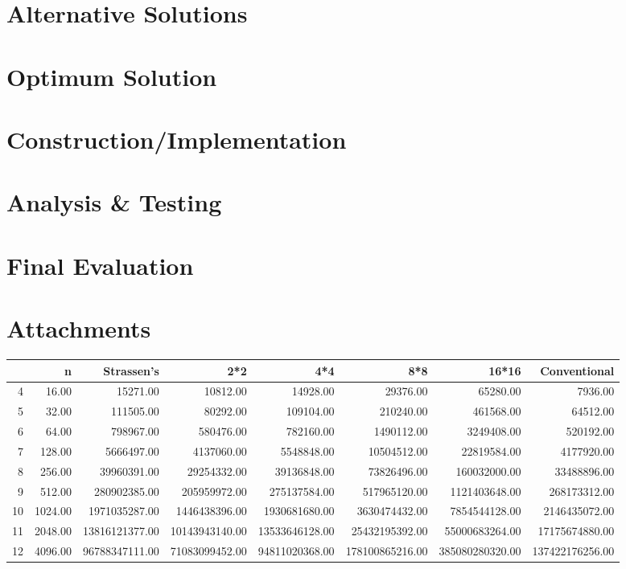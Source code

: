 \documentclass[a4paper, 11pt]{article}
\begin{document}
\section*{Alternative Solutions}

\section*{Optimum Solution}

\section*{Construction/Implementation}

\section*{Analysis \& Testing}

\section*{Final Evaluation}

\section*{Attachments}
\begin{landscape}
	\centering
	\begin{tabular}{rrrrrrrr}
		\hline
		& n & Strassen's & 2*2 & 4*4 & 8*8 & 16*16 & Conventional \\ 
		\hline
		4 & 16.00 & 15271.00 & 10812.00 & 14928.00 & 29376.00 & 65280.00 & 7936.00 \\ 
		5 & 32.00 & 111505.00 & 80292.00 & 109104.00 & 210240.00 & 461568.00 & 64512.00 \\ 
		6 & 64.00 & 798967.00 & 580476.00 & 782160.00 & 1490112.00 & 3249408.00 & 520192.00 \\ 
		7 & 128.00 & 5666497.00 & 4137060.00 & 5548848.00 & 10504512.00 & 22819584.00 & 4177920.00 \\ 
		8 & 256.00 & 39960391.00 & 29254332.00 & 39136848.00 & 73826496.00 & 160032000.00 & 33488896.00 \\ 
		9 & 512.00 & 280902385.00 & 205959972.00 & 275137584.00 & 517965120.00 & 1121403648.00 & 268173312.00 \\ 
		10 & 1024.00 & 1971035287.00 & 1446438396.00 & 1930681680.00 & 3630474432.00 & 7854544128.00 & 2146435072.00 \\ 
		11 & 2048.00 & 13816121377.00 & 10143943140.00 & 13533646128.00 & 25432195392.00 & 55000683264.00 & 17175674880.00 \\ 
		12 & 4096.00 & 96788347111.00 & 71083099452.00 & 94811020368.00 & 178100865216.00 & 385080280320.00 & 137422176256.00 \\ 
		\hline
	\end{tabular}
\end{landscape}
\end{document}
